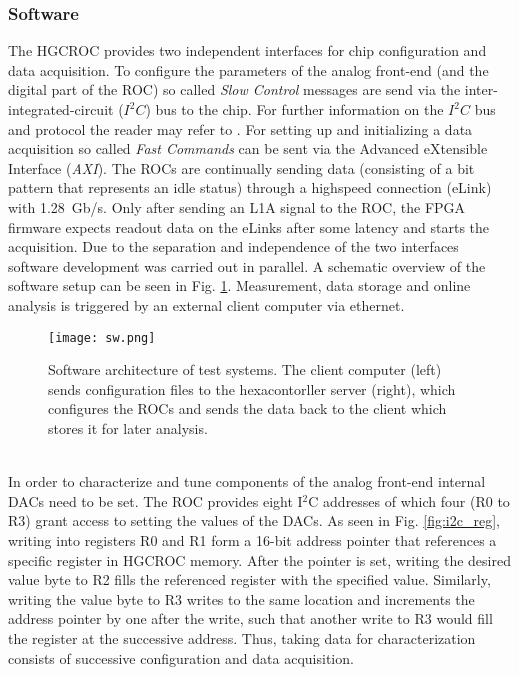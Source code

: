 \documentclass[../../main.tex]{subfiles}
\begin{document}
\subsubsection{Software}\label{sec:sw}
The HGCROC provides two independent interfaces for chip configuration and data acquisition. To configure the parameters of the analog front-end (and the digital part of the ROC) so called \textit{Slow Control} messages are send via the inter-integrated-circuit ($I^2C$) bus to the chip. For further information on the $I^2C$ bus and protocol the reader may refer to \cite{i2c}. For setting up and initializing a data acquisition so called \textit{Fast Commands} can be sent via the Advanced eXtensible Interface \cite{axi} (\textit{AXI}). The ROCs are continually sending data (consisting of a bit pattern that represents an idle status) through a highspeed connection (eLink) with \SI{1.28}{Gb/s}. Only after sending an L1A signal to the ROC, the FPGA firmware expects readout data on the eLinks after some latency and starts the acquisition. Due to the separation and independence of the two interfaces software development  was carried out in parallel. A schematic overview of the software setup can be seen in Fig. \ref{fig:sw}. Measurement, data storage and online analysis is triggered by an external client computer via ethernet.\\
\begin{figure}[htp]
	\begin{center}
		\texttt{[image: sw.png]}
		\caption{Software architecture of test systems. The client computer (left) sends configuration files to the hexacontorller server (right), which configures the ROCs and sends the data back to the client which stores it for later analysis.}
		\label{fig:sw}
	\end{center}
\end{figure}
\\
In order to characterize and tune components of the analog front-end internal DACs need to be set. The ROC provides eight I$^2$C addresses of which four (R0 to R3) grant access to setting the values of the DACs. As seen in Fig. \ref{fig:i2c_reg}, writing into registers R0 and R1 form a 16-bit address pointer that references a specific register in HGCROC memory. After the pointer is set, writing the desired value byte to R2 fills the referenced register with the specified value. Similarly, writing the value byte to R3 writes to the same location and increments the address pointer by one after the write, such that another write to R3 would fill the register at the successive address. Thus, taking data for characterization consists of successive configuration and data acquisition.\\
\end{document}
